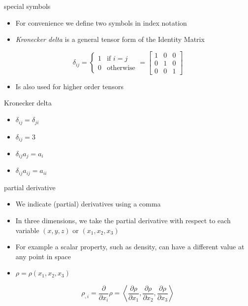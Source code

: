 \documentclass[
  letterpaper,
  ignorenonframetext,
  aspectratio=43,
  handout,
  12pt]{beamer}
\providecommand{\tightlist}{%
  \setlength{\itemsep}{0pt}\setlength{\parskip}{0pt}}
\providecommand{\tightlist}{%
\setlength{\itemsep}{0pt}\setlength{\parskip}{0pt}}
\begin{document}
\begin{frame}{special symbols}
\protect\hypertarget{special-symbols}{}
\begin{itemize}
\tightlist
\item
  For convenience we define two symbols in index notation
\item
  \emph{Kronecker delta} is a general tensor form of the Identity Matrix
\end{itemize}

\[\delta_{ij} = \left\{
\begin{array}{ll}
1& \text{if $i=j$}\\
0& \text{otherwise}
\end{array}
\right. = \begin{bmatrix}
1 & 0 & 0\\
0 & 1 & 0 \\
0 & 0 & 1
\end{bmatrix}\]

\begin{itemize}
\tightlist
\item
  Is also used for higher order tensors
\end{itemize}
\end{frame}

\begin{frame}{Kronecker delta}
\protect\hypertarget{kronecker-delta}{}
\begin{itemize}
\tightlist
\item
  \(\delta_{ij} = \delta_{ji}\)
\item
  \(\delta_{ij} = 3\)
\item
  \(\delta_{ij} a_j = a_i\)
\item
  \(\delta_{ij}a_{ij} = a_{ii}\)
\end{itemize}
\end{frame}

\begin{frame}{partial derivative}
\protect\hypertarget{partial-derivative}{}
\begin{itemize}
\tightlist
\item
  We indicate (partial) derivatives using a comma
\item
  In three dimensions, we take the partial derivative with respect to
  each variable \((x, y, z)\) or \((x_1, x_2, x_3)\)
\item
  For example a scalar property, such as density, can have a different
  value at any point in space
\item
  \(\rho = \rho(x_1, x_2, x_3)\)
\end{itemize}

\[\rho_{,i} = \frac{\partial}{\partial x_i} \rho = \left\langle \frac{\partial \rho }{\partial x_1}, \frac{\partial \rho }{\partial x_2}, \frac{\partial \rho }{\partial x_3} \right\rangle\]
\end{frame}
\end{document}
